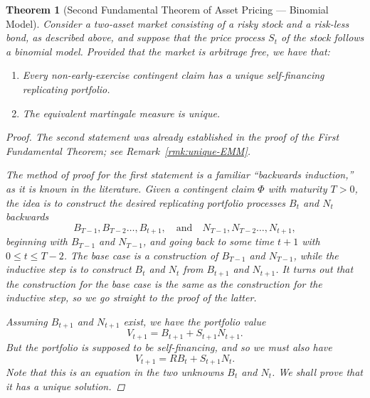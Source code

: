 \documentclass[11pt, openany, oneside]{book}
\newtheorem{thm}{Theorem}[section]
\theoremstyle{definition}
\theoremstyle{remark}
\theoremstyle{boldital}
\numberwithin{equation}{section}
\begin{document}
\begin{thm}[Second Fundamental Theorem of Asset Pricing --- Binomial Model]\label{thm:FTAP2-binomial}
Consider a two-asset market consisting of a risky stock and a risk-less bond, as described above, and suppose that the price process $S_t$ of the stock follows a binomial model. Provided that the market is arbitrage free, we have that:
\begin{enumerate}
\item Every non-early-exercise contingent claim has a unique self-financing replicating portfolio.
\item The equivalent martingale measure is unique.
\end{enumerate}
\begin{proof}
The second statement was already established in the proof of the First Fundamental Theorem; see Remark~\ref{rmk:unique-EMM}.

The method of proof for the first statement is a familiar ``backwards induction,'' as it is known in the literature. Given a contingent claim $\Phi$ with maturity $T>0$, the idea is to construct the desired replicating portfolio processes $B_t$ and $N_t$ backwards
	\[
	B_{T-1},B_{T-2} \ldots, B_{t+1}, \quad \text{and} \quad N_{T-1},N_{T-2} \ldots, N_{t+1},
	\]
beginning with $B_{T-1}$ and $N_{T-1}$, and going back to some time $t+1$ with $0 \leq t \leq T-2$. The base case is a construction of $B_{T-1}$ and $N_{T-1}$, while the inductive step is to construct $B_t$ and $N_t$ from $B_{t+1}$ and $N_{t+1}$. It turns out that the construction for the base case is the same as the construction for the inductive step, so we go straight to the proof of the latter.

Assuming $B_{t+1}$ and $N_{t+1}$ exist, we have the portfolio value
	\[
	V_{t+1} = B_{t+1} + S_{t+1}N_{t+1}.
	\]
But the portfolio is supposed to be self-financing, and so we must also have
	\begin{equation}\label{eq:self-financing}
	V_{t+1} = R B_t + S_{t+1}N_t.
	\end{equation}
Note that this is an equation in the two unknowns $B_t$ and $N_t$. We shall prove that it has a unique solution.


\end{proof}
\end{thm}
\end{document}
